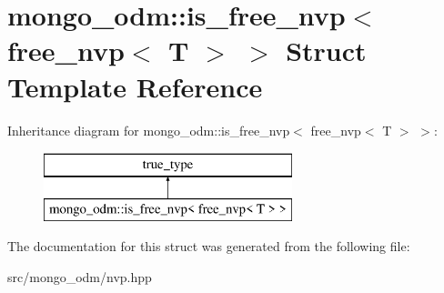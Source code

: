 \hypertarget{structmongo__odm_1_1is__free__nvp_3_01free__nvp_3_01T_01_4_01_4}{}\section{mongo\+\_\+odm\+:\+:is\+\_\+free\+\_\+nvp$<$ free\+\_\+nvp$<$ T $>$ $>$ Struct Template Reference}
\label{structmongo__odm_1_1is__free__nvp_3_01free__nvp_3_01T_01_4_01_4}
Inheritance diagram for mongo\+\_\+odm\+:\+:is\+\_\+free\+\_\+nvp$<$ free\+\_\+nvp$<$ T $>$ $>$\+:\begin{figure}[H]
\begin{center}
\leavevmode
\includegraphics[height=2.000000cm]{structmongo__odm_1_1is__free__nvp_3_01free__nvp_3_01T_01_4_01_4}
\end{center}
\end{figure}


The documentation for this struct was generated from the following file\+:\begin{DoxyCompactItemize}
\item 
src/mongo\+\_\+odm/nvp.\+hpp\end{DoxyCompactItemize}
